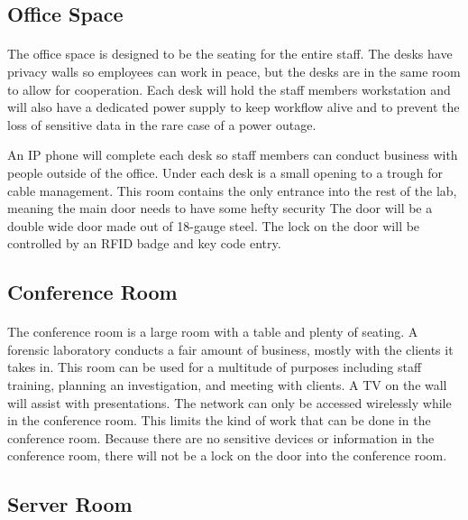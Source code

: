 \documentclass[12pt]{article}
\begin{document}
\subsection{Office Space}
\paragraph{} The office space is designed to be the seating for the entire staff.  
The desks have privacy walls so employees can work in peace, but the desks are in the same room to allow for cooperation.  
Each desk will hold the staff members workstation and will also have a dedicated power supply to keep workflow alive and to prevent the loss of sensitive data in the rare case of a power outage. 


An IP phone will complete each desk so staff members can conduct business with people outside of the office.
Under each desk is a small opening to a trough for cable management.
This room contains the only entrance into the rest of the lab, meaning the main door needs to have some hefty security
The door will be a double wide door made out of 18-gauge steel.
The lock on the door will be controlled by an RFID badge and key code entry.
\subsection{Conference Room}
\paragraph{}
The conference room is a large room with a table and plenty of seating.  
A forensic laboratory conducts a fair amount of business, mostly with the clients it takes in.
This room can be used for a multitude of purposes including staff training, planning an investigation, and meeting with clients.
A TV on the wall will assist with presentations.
The network can only be accessed wirelessly while in the conference room.
This limits the kind of work that can be done in the conference room.
Because there are no sensitive devices or information in the conference room, there will not be a lock on the door into the conference room.

\subsection{Server Room}
\end{document}
